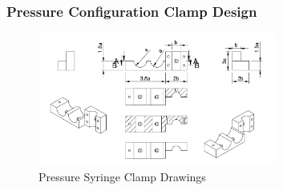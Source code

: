 \subsubsection{Pressure Configuration Clamp Design}

\begin{figure}
    \centering
    \includegraphics[width=0.7\textwidth]{Figures/SupportDrawings/pressure_conf_clamp_drawing.png}
    \caption{Pressure Syringe Clamp Drawings}
    \label{fig:pressuresyringeclampdrawing}
  \end{figure}